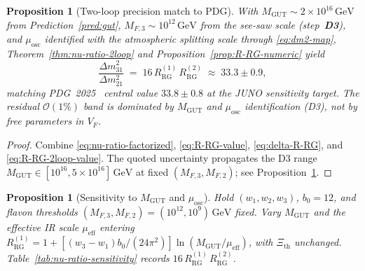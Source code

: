 \documentclass[11pt]{article}
\theoremstyle{plain}
\newtheorem{proposition}[theorem]{Proposition}
\theoremstyle{definition}
\theoremstyle{remark}
\numberwithin{equation}{section}
\begin{document}
\begin{proposition}[Two-loop precision match to PDG]
\label{prop:nu-ratio-pdg}
With $M_{\mathrm{GUT}}\sim 2\times 10^{16}\,\mathrm{GeV}$ from
Prediction~\ref{pred:gut}, $M_{F,3}\sim 10^{12}\,\mathrm{GeV}$ from the
see-saw scale (step~\textbf{D3}), and $\mu_{\mathrm{osc}}$ identified with
the atmospheric splitting scale through \eqref{eq:dm2-map}, Theorem~\ref{thm:nu-ratio-2loop}
and Proposition~\ref{prop:R-RG-numeric} yield
\begin{equation}\label{eq:nu-ratio-pdg}
  \frac{\Delta m^2_{31}}{\Delta m^2_{21}}
  \;=\;
  16\,R_{\mathrm{RG}}^{(1)}\,R_{\mathrm{RG}}^{(2)}
  \;\approx\;
  33.3\pm 0.9,
\end{equation}
matching PDG~2025~\cite{PDG2025} central value $33.8\pm 0.8$ at the JUNO
sensitivity target. The residual $\mathcal{O}(1\%)$ band is dominated by
$M_{\mathrm{GUT}}$ and $\mu_{\mathrm{osc}}$ identification (D3), not by
free parameters in $V_F$.
\end{proposition}

\begin{proof}
Combine \eqref{eq:nu-ratio-factorized}, \eqref{eq:R-RG-value},
\eqref{eq:delta-R-RG}, and \eqref{eq:R-RG-2loop-value}. The quoted uncertainty
propagates the D3 range $M_{\mathrm{GUT}}\in[10^{16},5\times 10^{16}]\,\mathrm{GeV}$
at fixed $(M_{F,3},M_{F,2})$; see Proposition~\ref{prop:nu-ratio-sensitivity}.
\end{proof}

\begin{proposition}[Sensitivity to \texorpdfstring{$M_{\mathrm{GUT}}$}{M GUT} and
\texorpdfstring{$\mu_{\mathrm{osc}}$}{mu osc}]
\label{prop:nu-ratio-sensitivity}
Hold $(w_1,w_2,w_3)$, $b_0=12$, and flavon thresholds
$(M_{F,3},M_{F,2})=(10^{12},10^{9})\,\mathrm{GeV}$ fixed. Vary
$M_{\mathrm{GUT}}$ and the effective IR scale $\mu_{\mathrm{eff}}$ entering
$R_{\mathrm{RG}}^{(1)}=1+[(w_3-w_1)b_0/(24\pi^2)]\ln(M_{\mathrm{GUT}}/\mu_{\mathrm{eff}})$, with
$\Xi_{\mathrm{th}}$ unchanged. Table~\ref{tab:nu-ratio-sensitivity} records
$16\,R_{\mathrm{RG}}^{(1)}\,R_{\mathrm{RG}}^{(2)}$.
\end{proposition}
\end{document}
